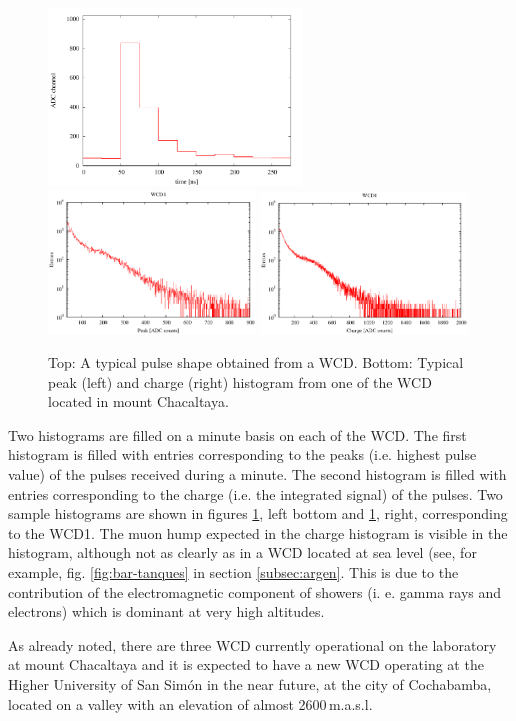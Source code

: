 \begin{figure}
\begin{center}
\includegraphics[width=0.6\textwidth]{images/bolivia/pulse.pdf}\\
\includegraphics[width=0.49\textwidth]{images/bolivia/peakhist1.eps}
\includegraphics[width=0.49\textwidth]{images/bolivia/chargehist1.eps}
\end{center}
\caption{Top: A typical pulse shape obtained from a WCD. Bottom: Typical peak (left) and charge (right) histogram from one of the WCD located in mount Chacaltaya.}
\label{fig:bolivia-res}
\end{figure}

Two histograms are filled on a minute basis on each of the WCD. The first
histogram is filled with entries corresponding to the peaks (i.e. highest pulse
value) of the pulses received during a minute. The second histogram is filled
with entries corresponding to the charge (i.e. the integrated signal) of the
pulses. Two sample histograms are shown in figures \ref{fig:bolivia-res}, left
bottom and \ref{fig:bolivia-res}, right, corresponding to the WCD1. The muon
hump expected in the charge histogram is visible in the histogram, although not
as clearly as in a WCD located at sea level (see, for example, fig.
\ref{fig:bar-tanques} in section \ref{subsec:argen}. This is due to the
contribution of the electromagnetic component of showers (i. e. gamma rays and
electrons) which is dominant at very high altitudes.

As already noted, there are three WCD currently operational on the laboratory
at mount Chacaltaya and it is expected to have a new WCD operating at the
Higher University of San Simón in the near future, at the city of Cochabamba,
located on a valley with an elevation of almost 2600\,m.a.s.l.
